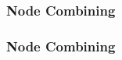 \documentclass{beamer}
\begin{document}
\begin{frame}
\frametitle{Node Combining}
\begin{figure}[h]
\end{figure}
\end{frame}

\begin{frame}
\frametitle{Node Combining}
\begin{figure}[h]
\end{figure}
\end{frame}
\end{document}

